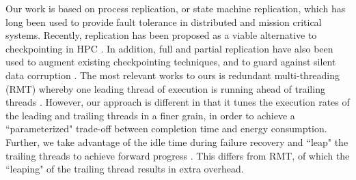Our work is based on process replication, or state machine replication, which has long been used to provide fault tolerance in distributed and mission critical systems\cite{schneider_1990_tutorial}. %
Recently, replication has been proposed as a
viable alternative to checkpointing in HPC \cite{ferreira_sc_2011,Cappello:09:Fault,fiala_2012_sdc}. 
In addition, full and partial
replication have also been used to augment existing checkpointing techniques, and to guard
against silent data corruption \cite{stearly_2012_partial,elliott_2012_cpr}.%
The most relevant works to ours is redundant multi-threading (RMT) whereby one leading thread of execution is running ahead of trailing threads \cite{reinhardt2000transient,Wadden:2014:RDE:2665671.2665686}. However, our approach is different in that it tunes the execution rates of the leading and trailing threads in a finer grain, in order to achieve a ``parameterized" trade-off between completion time and energy consumption. Further, we take advantage of the idle time during failure recovery and ``leap" the trailing threads to achieve forward progress%
. This differs from RMT, of which the ``leaping" of the trailing thread results in extra overhead.
